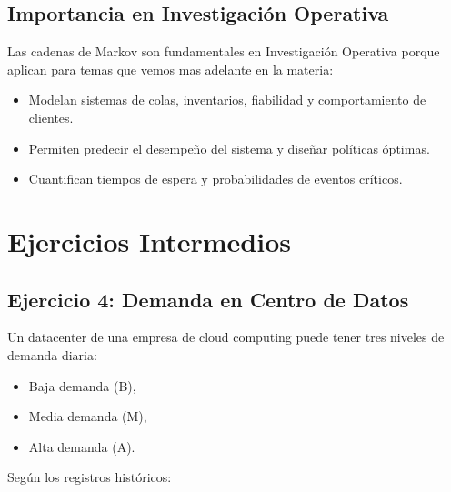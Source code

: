 \documentclass[a4paper,11pt]{article}
\begin{document}
\subsection{Importancia en Investigación Operativa}

Las cadenas de Markov son fundamentales en Investigación Operativa porque aplican para temas que vemos mas adelante en la materia:

\begin{itemize}
    \item Modelan sistemas de colas, inventarios, fiabilidad y comportamiento de clientes.
    \item Permiten predecir el desempeño del sistema y diseñar políticas óptimas.
    \item Cuantifican tiempos de espera y probabilidades de eventos críticos.
\end{itemize}

\section{Ejercicios Intermedios}

\subsection{Ejercicio 4: Demanda en Centro de Datos}

Un datacenter de una empresa de cloud computing puede tener tres niveles de demanda diaria:

\begin{itemize}
    \item Baja demanda (B),
    \item Media demanda (M),
    \item Alta demanda (A).
\end{itemize}

Según los registros históricos:
\end{document}
